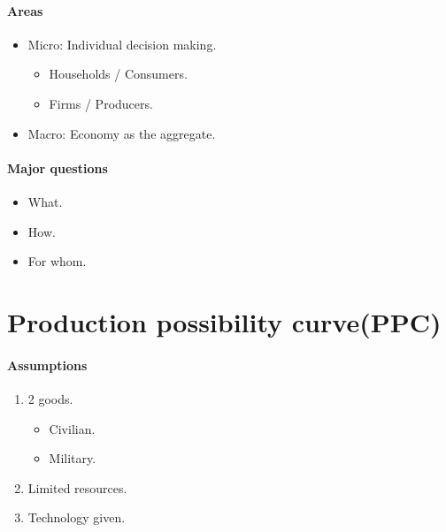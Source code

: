 \documentclass{article}
\begin{document}
	\paragraph{Areas}
	\begin{itemize}
		\item Micro: Individual decision making.
			\begin{itemize}
				\item Households / Consumers.
				\item Firms / Producers.
			\end{itemize}
		\item Macro: Economy as the aggregate.
	\end{itemize}
	\paragraph{Major questions}
	\begin{itemize}
		\item What.
		\item How.
		\item For whom.
	\end{itemize}
	\section{Production possibility curve(PPC)}
	\paragraph{Assumptions}
	\begin{enumerate}
		\item 2 goods.
			\begin{itemize}
				\item Civilian.
				\item Military.
			\end{itemize}
		\item Limited resources.
		\item Technology given.
	\end{enumerate}
\end{document}
